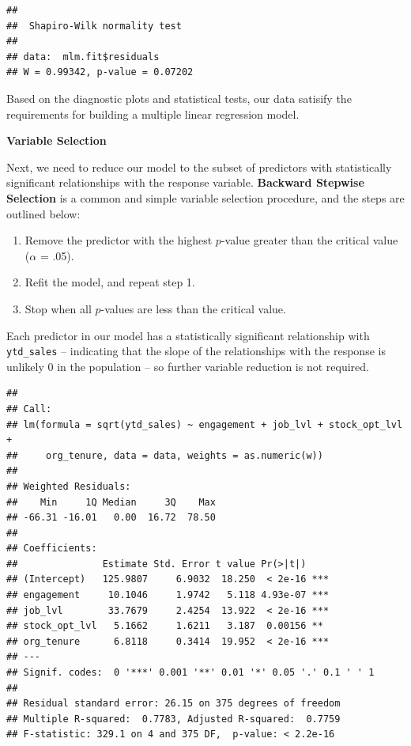 \documentclass[
]{book}
\newenvironment{Shaded}{\begin{snugshade}}{\end{snugshade}}
\newcommand{\CommentTok}[1]{\textcolor[rgb]{0.56,0.35,0.01}{\textit{#1}}}
\newcommand{\FunctionTok}[1]{\textcolor[rgb]{0.00,0.00,0.00}{#1}}
\newcommand{\NormalTok}[1]{#1}
\newcommand{\SpecialCharTok}[1]{\textcolor[rgb]{0.00,0.00,0.00}{#1}}
\providecommand{\tightlist}{%
  \setlength{\itemsep}{0pt}\setlength{\parskip}{0pt}}
\begin{document}
\begin{Shaded}
\end{Shaded}

\begin{verbatim}
## 
##  Shapiro-Wilk normality test
## 
## data:  mlm.fit$residuals
## W = 0.99342, p-value = 0.07202
\end{verbatim}

Based on the diagnostic plots and statistical tests, our data satisify the requirements for building a multiple linear regression model.

\textbf{Variable Selection}

Next, we need to reduce our model to the subset of predictors with statistically significant relationships with the response variable. \textbf{Backward Stepwise Selection} is a common and simple variable selection procedure, and the steps are outlined below:

\begin{enumerate}
\def\labelenumi{\arabic{enumi}.}
\tightlist
\item
  Remove the predictor with the highest \(p\)-value greater than the critical value (\(\alpha\) = .05).
\item
  Refit the model, and repeat step 1.
\item
  Stop when all \(p\)-values are less than the critical value.
\end{enumerate}

Each predictor in our model has a statistically significant relationship with \texttt{ytd\_sales} -- indicating that the slope of the relationships with the response is unlikely 0 in the population -- so further variable reduction is not required.

\begin{verbatim}
## 
## Call:
## lm(formula = sqrt(ytd_sales) ~ engagement + job_lvl + stock_opt_lvl + 
##     org_tenure, data = data, weights = as.numeric(w))
## 
## Weighted Residuals:
##    Min     1Q Median     3Q    Max 
## -66.31 -16.01   0.00  16.72  78.50 
## 
## Coefficients:
##               Estimate Std. Error t value Pr(>|t|)    
## (Intercept)   125.9807     6.9032  18.250  < 2e-16 ***
## engagement     10.1046     1.9742   5.118 4.93e-07 ***
## job_lvl        33.7679     2.4254  13.922  < 2e-16 ***
## stock_opt_lvl   5.1662     1.6211   3.187  0.00156 ** 
## org_tenure      6.8118     0.3414  19.952  < 2e-16 ***
## ---
## Signif. codes:  0 '***' 0.001 '**' 0.01 '*' 0.05 '.' 0.1 ' ' 1
## 
## Residual standard error: 26.15 on 375 degrees of freedom
## Multiple R-squared:  0.7783, Adjusted R-squared:  0.7759 
## F-statistic: 329.1 on 4 and 375 DF,  p-value: < 2.2e-16
\end{verbatim}
\end{document}
